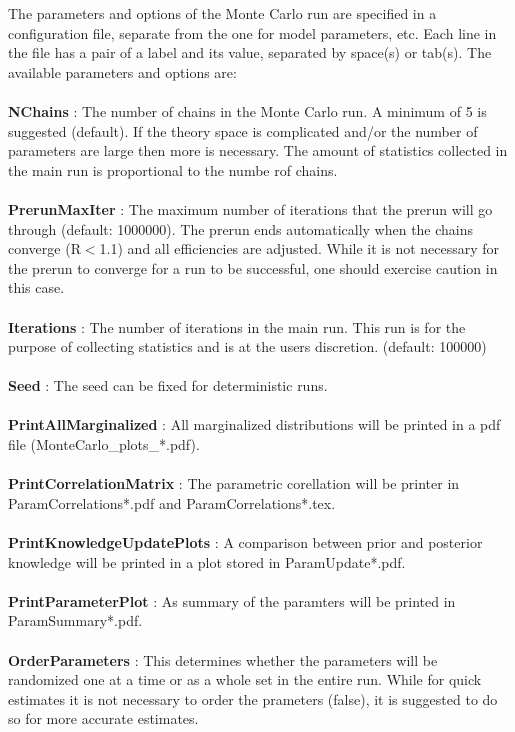 \documentclass[preprint,3p,12pt]{elsarticle}
\begin{document}
{The parameters and options of the Monte Carlo run are specified in
a configuration file, separate from the one for model parameters,
etc. Each line in the file has a pair of a label
and its value, separated by space(s) or tab(s). The available
parameters and options are: \\\\
{\bf NChains} : The number of chains in the Monte Carlo run. A minimum of 5 is suggested (default). 
If the theory space is complicated and/or the number of parameters are large then more
is necessary. The amount of statistics collected in the main run is proportional to the
numbe rof chains.\\\\
{\bf PrerunMaxIter} : The maximum number of iterations that the prerun will go through (default: 1000000). 
The prerun ends automatically when the chains converge (R$<$1.1) and all efficiencies 
are adjusted. While it is not necessary for the prerun to converge for a run to be 
successful, one should exercise caution in this case.\\\\
{\bf Iterations} : The number of iterations in the main run. This run is for the purpose of
collecting statistics and is at the users discretion. (default: 100000)\\\\
{\bf Seed} : The seed can be fixed for deterministic runs.\\\\
{\bf PrintAllMarginalized} : All marginalized distributions will be printed in a pdf file
(MonteCarlo\_plots\_*.pdf).\\\\
{\bf PrintCorrelationMatrix} : The parametric corellation will be printer in ParamCorrelations*.pdf
and ParamCorrelations*.tex.\\\\
{\bf PrintKnowledgeUpdatePlots} : A comparison between prior and posterior knowledge will be 
printed in a plot stored in ParamUpdate*.pdf.\\\\
{\bf PrintParameterPlot} : As summary of the paramters will be printed in ParamSummary*.pdf.\\\\
{\bf OrderParameters} : This determines whether the parameters will be randomized one
at a time or as a whole set in the entire run. While for quick estimates it is not necessary
to order the prameters (false), it is suggested to do so for more accurate estimates.\\\\
}
\end{document}
